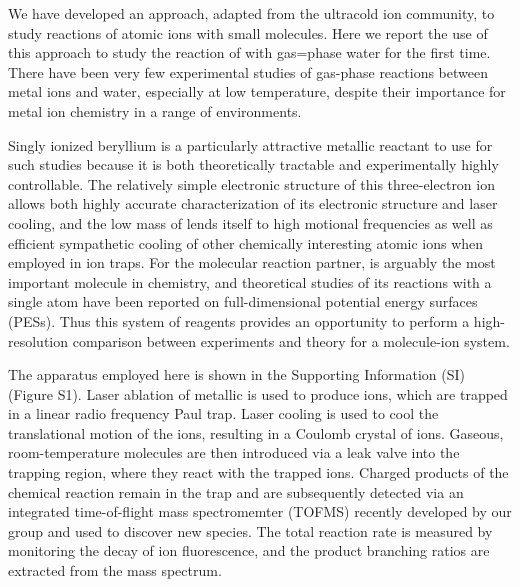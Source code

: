 We have developed an approach, adapted from the ultracold ion community,\cite{Hudson2016,Tomza2017,Willitsch2012a} to study reactions of atomic ions with small molecules. Here we report the use of this approach to study the reaction of  with gas=phase water for the first time. There have been very few experimental studies of gas-phase reactions between metal ions and water, especially at low temperature, despite their importance for metal ion chemistry in a range of environments.\cite{Highberger2001,Oppenheimer2002,VanDishoeck2013a}

Singly ionized beryllium is a particularly attractive metallic reactant to use for such studies because it is both theoretically tractable and experimentally highly controllable. The relatively simple electronic structure of this three-electron ion allows both highly accurate characterization of its electronic structure and laser cooling,\cite{Bollinger1985} and the low mass of  lends itself to high motional frequencies as well as efficient sympathetic cooling of other chemically interesting atomic ions when employed in ion traps.\cite{Chen2014a,Roth2006,Larson1986,Schowalter2016} For the molecular reaction partner,  is arguably the most important molecule in chemistry, and theoretical studies of its reactions with a single atom have been reported on full-dimensional potential energy surfaces (PESs).\cite{Li2013,Song2015,Ray2017,Li2015,Xiao2011} Thus this system of reagents provides an opportunity to perform a high-resolution comparison between experiments and theory for a molecule-ion system.

The apparatus employed here is shown in the Supporting Information (SI) (Figure S1). Laser ablation of metallic  is used to produce  ions, which are trapped in a linear radio frequency Paul trap.\cite{Wolfgang1990} Laser cooling \cite{Wineland1979} is used to cool the translational motion of the ions, resulting in a Coulomb crystal of  ions. Gaseous, room-temperature  molecules are then introduced via a leak valve into the trapping region, where they react with the trapped ions. Charged products of the chemical reaction remain in the trap and are subsequently detected via an integrated time-of-flight mass spectromemter (TOFMS) recently developed by our group\cite{Schowalter2012,Schneider2014} and used to discover new species.\cite{Puri2017} The total reaction rate is measured by monitoring the decay of  ion fluorescence, and the product branching ratios are extracted from the mass spectrum.

